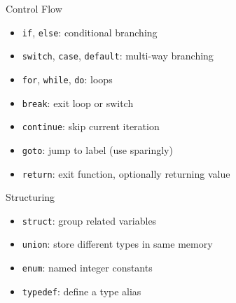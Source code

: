 \documentclass[12pt, aspectratio=169]{beamer}
\begin{document}
    \begin{frame}{Control Flow}
        \begin{itemize}
            \item \texttt{if}, \texttt{else}: conditional branching
            \item \texttt{switch}, \texttt{case}, \texttt{default}: multi-way branching
            \item \texttt{for}, \texttt{while}, \texttt{do}: loops
            \item \texttt{break}: exit loop or switch
            \item \texttt{continue}: skip current iteration
            \item \texttt{goto}: jump to label (use sparingly)
            \item \texttt{return}: exit function, optionally returning value
        \end{itemize}
    \end{frame}


    \begin{frame}{Structuring}
        \begin{itemize}
            \item \texttt{struct}: group related variables
            \item \texttt{union}: store different types in same memory
            \item \texttt{enum}: named integer constants
            \item \texttt{typedef}: define a type alias
        \end{itemize}
    \end{frame}


\end{document}
